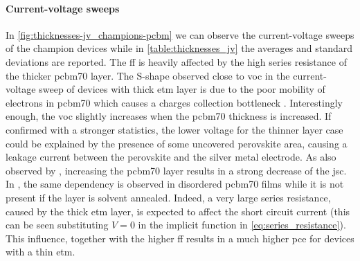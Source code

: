 \paragraph{Current-voltage sweeps}
In \cref{fig:thicknesses-jv_champions-pcbm} we can observe the current-voltage sweeps of the champion devices while in \cref{table:thicknesses_jv} the averages and standard deviations are reported.
The \gls{ff} is heavily affected by the high series resistance of the thicker \gls{pcbm70} layer.
The S-shape observed close to \gls{voc} in the current\hyp{}voltage sweep of devices with thick \gls{etm} layer is due to the poor mobility of electrons in \gls{pcbm70} \cite{VonHauff2005} which causes a charges collection bottleneck \cite{Wheeler2015}. 
Interestingly enough, the \gls{voc} slightly increases when the \gls{pcbm70} thickness is increased.
If confirmed with a stronger statistics, the lower voltage for the thinner layer case could be explained by the presence of some uncovered perovskite area, causing a leakage current between the perovskite and the silver metal electrode.
As also observed by , increasing the \gls{pcbm70} layer results in a strong decrease of the \gls{jsc}.
In , the same dependency is observed in disordered \gls{pcbm70} films while it is not present if the layer is solvent annealed.
Indeed, a very large series resistance, caused by the thick \gls{etm} layer, is expected to affect the short circuit current (this can be seen substituting $V=0$ in the implicit function in \cref{eq:series_resistance}).
This influence, together with the higher \gls{ff} results in a much higher \gls{pce} for devices with a thin \gls{etm}.

